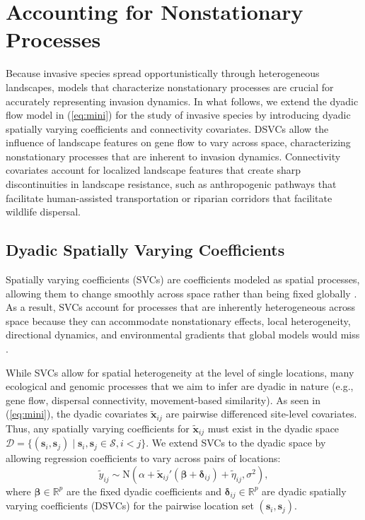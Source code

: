 \documentclass{article}
\begin{document}
\section{Accounting for Nonstationary Processes}
Because invasive species spread opportunistically through heterogeneous landscapes, models that characterize nonstationary processes are crucial for accurately representing invasion dynamics.
In what follows, we extend the dyadic flow model in (\ref{eq:mini}) for the study of invasive species by introducing dyadic spatially varying coefficients and connectivity covariates. DSVCs allow the influence of landscape features on gene flow to vary across space, characterizing nonstationary processes that are inherent to invasion dynamics. Connectivity covariates account for localized landscape features that create sharp discontinuities in landscape resistance, such as anthropogenic pathways that facilitate human-assisted transportation or riparian corridors that facilitate wildlife dispersal.

\subsection{Dyadic Spatially Varying Coefficients}
Spatially varying coefficients (SVCs) are coefficients modeled as spatial processes, allowing them to change smoothly across space rather than being fixed globally \citep{gelfand2003spatial}. As a result, SVCs account for processes that are inherently heterogeneous across space because they can accommodate nonstationary effects, local heterogeneity, directional dynamics, and environmental gradients that global models would miss \citep{kim2021generalized,doser2025modeling}. 

While SVCs allow for spatial heterogeneity at the level of single locations, many ecological and genomic processes that we aim to infer are dyadic in nature (e.g., gene flow, dispersal connectivity, movement-based similarity). As seen in (\ref{eq:mini}), the dyadic covariates $\widetilde{\mathbf{x}}_{ij}$ are pairwise differenced site-level covariates. Thus, any spatially varying coefficients for $\widetilde{\mathbf{x}}_{ij}$ must exist in the dyadic space $\mathcal{D}=\{(\mathbf{s}_i,\mathbf{s}_j)\mid \mathbf{s}_i,\mathbf{s}_j\in\mathcal{S},i<j\}$. We extend SVCs to the dyadic space by allowing regression coefficients to vary across pairs of locations:
\begin{equation}\label{eq:wSVCs}
    \widetilde{y}_{ij}\sim \text{N}\left(\alpha+\mathbf{\widetilde{x}}_{ij}'(\boldsymbol{\beta} + \boldsymbol\delta_{ij}) + \widetilde{\eta}_{ij},\sigma^2\right),
\end{equation}
where $\boldsymbol\beta\in\mathbb{R}^p$ are the fixed dyadic coefficients and $\boldsymbol\delta_{ij}\in\mathbb{R}^p$ are dyadic spatially varying coefficients (DSVCs) for the pairwise location set $(\mathbf{s}_i,\mathbf{s}_j)$. 
\end{document}
